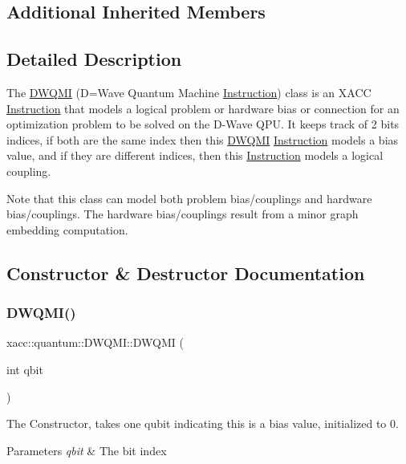 \subsection*{Additional Inherited Members}


\subsection{Detailed Description}
The \hyperlink{a01225}{D\+W\+Q\+MI} (D=Wave Quantum Machine \hyperlink{a01657}{Instruction}) class is an X\+A\+CC \hyperlink{a01657}{Instruction} that models a logical problem or hardware bias or connection for an optimization problem to be solved on the D-\/\+Wave Q\+PU. It keeps track of 2 bits indices, if both are the same index then this \hyperlink{a01225}{D\+W\+Q\+MI} \hyperlink{a01657}{Instruction} models a bias value, and if they are different indices, then this \hyperlink{a01657}{Instruction} models a logical coupling.

Note that this class can model both problem bias/couplings and hardware bias/couplings. The hardware bias/couplings result from a minor graph embedding computation. 

\subsection{Constructor \& Destructor Documentation}
\mbox{\label{a01225_a7fa74443cf18934c1f166e8343eada48}} 
\subsubsection{\texorpdfstring{D\+W\+Q\+M\+I()}{DWQMI()}\hspace{0.1cm}{\footnotesize\ttfamily [1/3]}}
{\footnotesize\ttfamily xacc\+::quantum\+::\+D\+W\+Q\+M\+I\+::\+D\+W\+Q\+MI (\begin{DoxyParamCaption}\item[{int}]{qbit }\end{DoxyParamCaption})\hspace{0.3cm}{\ttfamily [inline]}}

The Constructor, takes one qubit indicating this is a bias value, initialized to 0.


\begin{DoxyParams}{Parameters}
{\em qbit} & The bit index \\
\hline
\end{DoxyParams}
\mbox{\label{a01225_a219507677fcdf59ee0ddfa8c78e59539}} 
